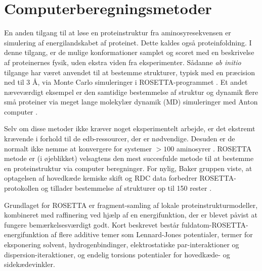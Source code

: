\section*{Computerberegningsmetoder}
En anden tilgang til at løse en proteinstruktur fra aminosyresekvensen er simulering
af energilandskabet af proteinet. Dette kaldes også proteinfoldning. I denne
tilgang, er de mulige konformationer samplet og scoret med en beskrivelse af proteinernes fysik, uden ekstra viden fra eksperimenter. Sådanne \textit{ab initio} tilgange har været anvendet til at bestemme strukturer, typisk med en præcision ned til 3 \AA, via Monte Carlo simuleringer i ROSETTA-programmet \cite{rosetta}. Et andet næveværdigt eksempel er den samtidige bestemmelse af struktur
og dynamik flere små proteiner via meget lange molekylær dynamik (MD) simuleringer med
Anton computer \cite{rdcensemble}.

Selv om disse metoder ikke kræver noget eksperimentelt arbejde, er det ekstremt krævende i
forhold til de edb-ressourcer, der er nødvendige. Desuden er de normalt ikke nemme at konvergere for systemer $>100$ aminosyrer \cite{Lange2012}.
ROSETTA metode er (i øjeblikket) velsagtens den mest succesfulde metode til at bestemme
en proteinstruktur via computer beregninger. For nylig, Baker gruppen viste, at optagelsen af hovedkæde kemiske skift og RDC data forbedrer ROSETTA-protokollen og tillader bestemmelse af strukturer op til 150 rester \cite{Baker2010,Lange2012}. 

Grundlaget for ROSETTA er fragment-samling af lokale proteinstrukturmodeller, kombineret med raffinering ved hjælp af en energifunktion, der er blevet påvist at fungere bemærkelsesværdigt godt. 
Kort beskrevet  består fuldatom-ROSETTA-energifunktion af flere additive temer som Lennard-Jones potentialer, termer for eksponering solvent, hydrogenbindinger, elektrostatiske par-interaktioner og dispersion-iteraktioner, og endelig torsions potentialer for hovedkæde- og sidekædevinkler. 

